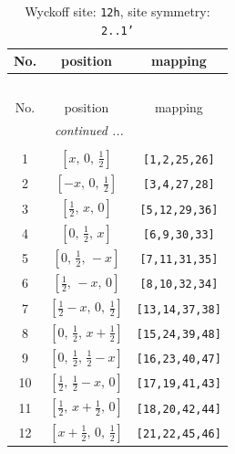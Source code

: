 \documentclass[fleqn,8pt]{jsarticle}
\begin{document}
\begin{longtable}{ccc}
\caption{Wyckoff site: {\tt 12h}, site symmetry: {\tt 2..1'}}
 \\
 \hline \hline
No. & position & mapping \\ \hline \endfirsthead

\multicolumn{2}{l}{\tablename\ \thetable{}} \\
 \hline \hline
No. & position & mapping \\ \hline \endhead

 \hline \hline
\multicolumn{2}{r}{\footnotesize\it continued ...} \\ \endfoot

 \hline \hline
\multicolumn{2}{r}{} \\ \endlastfoot

1 & $\left[ x,\, 0,\, \frac{1}{2} \right]$ & {\tt [1,2,25,26]} \\ \hline
2 & $\left[ - x,\, 0,\, \frac{1}{2} \right]$ & {\tt [3,4,27,28]} \\ \hline
3 & $\left[ \frac{1}{2},\, x,\, 0 \right]$ & {\tt [5,12,29,36]} \\ \hline
4 & $\left[ 0,\, \frac{1}{2},\, x \right]$ & {\tt [6,9,30,33]} \\ \hline
5 & $\left[ 0,\, \frac{1}{2},\, - x \right]$ & {\tt [7,11,31,35]} \\ \hline
6 & $\left[ \frac{1}{2},\, - x,\, 0 \right]$ & {\tt [8,10,32,34]} \\ \hline
7 & $\left[ \frac{1}{2} - x,\, 0,\, \frac{1}{2} \right]$ & {\tt [13,14,37,38]} \\ \hline
8 & $\left[ 0,\, \frac{1}{2},\, x + \frac{1}{2} \right]$ & {\tt [15,24,39,48]} \\ \hline
9 & $\left[ 0,\, \frac{1}{2},\, \frac{1}{2} - x \right]$ & {\tt [16,23,40,47]} \\ \hline
10 & $\left[ \frac{1}{2},\, \frac{1}{2} - x,\, 0 \right]$ & {\tt [17,19,41,43]} \\ \hline
11 & $\left[ \frac{1}{2},\, x + \frac{1}{2},\, 0 \right]$ & {\tt [18,20,42,44]} \\ \hline
12 & $\left[ x + \frac{1}{2},\, 0,\, \frac{1}{2} \right]$ & {\tt [21,22,45,46]} \\
\end{longtable}
\renewcommand{\arraystretch}{1.2}
\end{document}
